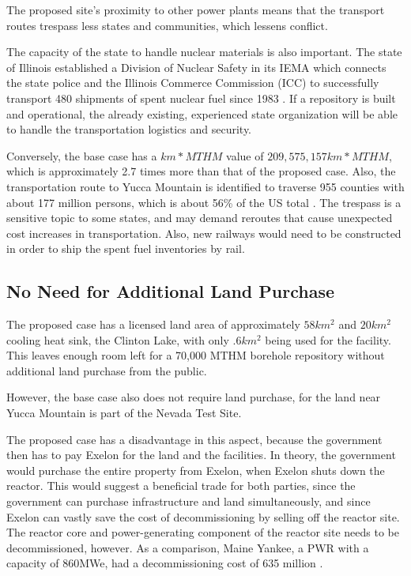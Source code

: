 The proposed site's proximity to other power plants means that the transport
routes trespass less states and communities, which lessens conflict.

The capacity of the state to handle nuclear materials is also important.
The state of Illinois established a Division of Nuclear Safety in its \gls{IEMA}
which connects the state police and the Illinois Commerce Commission (ICC) to
 successfully transport 480 shipments of spent nuclear fuel since 1983
 \cite{IMEA}. If a repository is built and operational, the already existing,
 experienced state organization will be able to handle the transportation logistics
 and security.  

Conversely, the base case has a $km*MTHM$ value of $209,575,157 km*MTHM$, 
which is approximately 2.7 times more than that of the proposed case. Also, the 
transportation route to Yucca Mountain is identified to traverse 955 counties
with about 177 million persons, which is about 56\% of the US total
 \cite{Dilger_2015}. The trespass is a sensitive topic to some states, and may
 demand reroutes that cause unexpected cost increases in transportation. Also,
 new railways would need to be constructed in order to ship the spent fuel inventories
 by rail. 


\subsection{No Need for Additional Land Purchase}



The proposed case has a licensed land area of approximately $58km^2$ and $20km^2$
 cooling heat sink, the Clinton Lake, with only $.6km^2$ being used for the facility.
  \cite{NRC_Clinton} This leaves enough room left for a 70,000 \gls{MTHM} borehole
  repository without additional land purchase from the public.
  
  However, the base case also does not require land purchase, for the land near 
  Yucca Mountain is part of the Nevada Test Site. 
  
  The proposed case has a disadvantage in this aspect, because the government
  then has  to pay Exelon for the land and the facilities. In theory, the government
  would purchase the entire property from Exelon, when Exelon shuts down the reactor.
  This would suggest a beneficial trade for both parties, since the government
  can purchase infrastructure and land simultaneously, and since Exelon can vastly
  save the cost of decommissioning by selling off the reactor site. The reactor
  core and power-generating component of the reactor site needs to be decommissioned,
  however. As a comparison, Maine Yankee, a PWR with a capacity of 860MWe, had a
  decommissioning cost of 635 million \cite{Maine_Yankee}.


